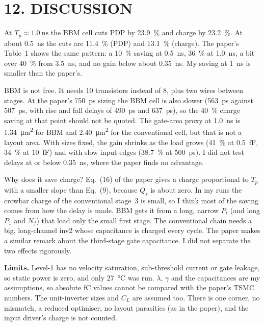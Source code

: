 \documentclass[11pt,a4paper]{article}
\newcommand{\sect}[1]{\section*{#1}}
\begin{document}
\sect{12. DISCUSSION}
At $T_p\approx\SI{1.0}{\nano\second}$ the BBM cell cuts PDP by \SI{23.9}{\percent} and charge by \SI{23.2}{\percent}. At about \SI{0.5}{\nano\second} the cuts are \SI{11.4}{\percent} (PDP) and \SI{13.1}{\percent} (charge). The paper's Table~1 shows the same pattern: a \SI{10}{\percent} saving at \SI{0.5}{\nano\second}, \SI{36}{\percent} at \SI{1.0}{\nano\second}, a bit over \SI{40}{\percent} from \SI{3.5}{\nano\second}, and no gain below about \SI{0.35}{\nano\second}. My saving at \SI{1}{\nano\second} is smaller than the paper's.

BBM is not free. It needs 10 transistors instead of 8, plus two wires between stages. At the paper's \SI{750}{\pico\second} sizing the BBM cell is also slower (\SI{563}{\pico\second} against \SI{507}{\pico\second}, with rise and fall delays of \SI{490}{\pico\second} and \SI{637}{\pico\second}), so the \SI{40}{\percent} charge saving at that point should not be quoted. The gate-area proxy at \SI{1.0}{\nano\second} is \SI{1.34}{\micro\meter\squared} for BBM and \SI{2.40}{\micro\meter\squared} for the conventional cell, but that is not a layout area. With sizes fixed, the gain shrinks as the load grows (\SI{41}{\percent} at \SI{0.5}{\femto\farad}, \SI{34}{\percent} at \SI{10}{\femto\farad}) and with slow input edges (\SI{38.7}{\percent} at \SI{500}{\pico\second}). I did not test delays at or below \SI{0.35}{\nano\second}, where the paper finds no advantage.

Why does it save charge? Eq.~(16) of the paper gives a charge proportional to $T_p$ with a smaller slope than Eq.~(9), because $Q_s$ is about zero. In my runs the crowbar charge of the conventional stage~3 is small, so I think most of the saving comes from how the delay is made. BBM gets it from a long, narrow $P_t$ (and long $P_1$ and $N_f$) that load only the small first stage. The conventional chain needs a big, long-channel inv2 whose capacitance is charged every cycle. The paper makes a similar remark about the third-stage gate capacitance. I did not separate the two effects rigorously.

\textbf{Limits.} Level-1 has no velocity saturation, sub-threshold current or gate leakage, so static power is zero, and only \SI{27}{\celsius} was run. $\lambda$, $\gamma$ and the capacitances are my assumptions, so absolute fC values cannot be compared with the paper's TSMC numbers. The unit-inverter sizes and $C_L$ are assumed too. There is one corner, no mismatch, a reduced optimiser, no layout parasitics (as in the paper), and the input driver's charge is not counted.
\end{document}

